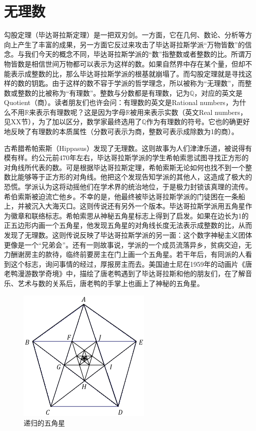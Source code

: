 \documentclass[b5paper]{ctexart}
\begin{document}
\section{无理数}
勾股定理（毕达哥拉斯定理）是一把双刃剑。一方面，它在几何、数论、分析等方向上产生了丰富的成果，另一方面它反过来攻击了毕达哥拉斯学派“万物皆数”的信念。与我们今天的概念不同，毕达哥拉斯学派的“数”指整数或者整数的比。所谓万物皆数是相信世间万物都可以表示为这样的数。如果自然界中存在某个量，但却不能表示成整数的比，那么毕达哥拉斯学派的根基就崩塌了。而勾股定理就是寻找这样的数的钥匙。由于这样的数不容于学派的哲学理念，所以被称为“无理数”，而整数或整数的比被称为“有理数”。整数与分数都是有理数，记为$\mathbb{Q}$，对应的英文是Quotient（商）。读者朋友们也许会问：有理数的英文是Rational numbers，为什么不用$\mathbb{R}$来表示有理数呢？这是因为字母$\mathbb{R}$被用来表示实数（英文Real numbers，见XX节），为了加以区分，数学家最终选用了$\mathbb{Q}$作为有理数的符号。它也的确更好地反映了有理数的本质属性（分数可表示为商，整数可表示成除数为1的商）。

古希腊希帕索斯（Hippasus）发现了无理数。这则故事为人们津津乐道，被说得有模有样。约公元前470年左右，毕达哥拉斯学派的学生希帕索思试图寻找正方形的对角线所代表的数。可是根据毕达哥拉斯定理，希帕索斯无论如何也找不到一个整数比能够等于正方形的对角线。他把这个发现告知学派的其他人，这造成了极大的恐慌。学派认为这将动摇他们在学术界的统治地位，于是极力封锁该真理的流传。希伯索斯被迫流亡他乡。不幸的是，他最终被毕达哥拉斯学派的门徒困在一条船上，并被沉入大海灭口。这则传说还有另外一个版本。毕达哥拉斯学派用五角星作为徽章和联络标志。希帕索思从神秘五角星标志上得到了启发。如果在边长为1的正五边形内画一个五角星，他发现五角星的对角线长度无法表示成整数的比，从而发现了无理数。这则传说反映了毕达哥拉斯学派的另一面：这个数字神秘主义团体更像是一个“兄弟会”。还有一则故事说，学派的一个成员流落异乡，贫病交迫，无力酬谢房主的款待，临终前要房主在门上画一个五角星。若干年后，有同派的人看到这个标志，询问事情的经过，厚报房主而去\cite{HanXueTao16}。美国迪士尼在1959年的动画片《唐老鸭漫游数学奇境》中，描绘了唐老鸭遇到了毕达哥拉斯和他的朋友们，在了解音乐、艺术与数的关系后，唐老鸭的手掌上也画上了神秘的五角星。

\begin{figure}[htbp]
 \centering
 \includegraphics[scale=0.5]{img/pentagram}
 \caption{递归的五角星}
 \label{fig:pentagram}
\end{figure}
\end{document}

